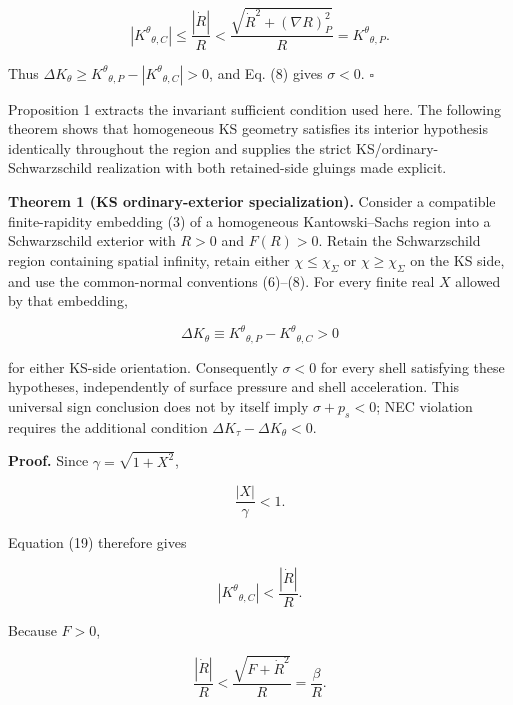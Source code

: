 \documentclass[pdflatex,sn-mathphys-num]{sn-jnl}
\begin{document}
\[
\left|K^\theta{}_{\theta,C}\right|
\le\frac{|\dot R|}{R}
<\frac{\sqrt{\dot R^2+(\nabla R)^2_P}}{R}
=K^\theta{}_{\theta,P}.
\]

Thus \(\Delta K_\theta\ge K^\theta{}_{\theta,P}-|K^\theta{}_{\theta,C}|>0\), and Eq. (8) gives \(\sigma<0\). \(\square\)


Proposition 1 extracts the invariant sufficient condition used here. The following theorem shows that homogeneous KS geometry satisfies its interior hypothesis identically throughout the region and supplies the strict KS/ordinary-Schwarzschild realization with both retained-side gluings made explicit.


\textbf{Theorem 1 (KS ordinary-exterior specialization).} Consider a compatible finite-rapidity embedding (3) of a homogeneous Kantowski--Sachs region into a Schwarzschild exterior with \(R>0\) and \(F(R)>0\). Retain the Schwarzschild region containing spatial infinity, retain either \(\chi\le\chi_\Sigma\) or \(\chi\ge\chi_\Sigma\) on the KS side, and use the common-normal conventions (6)--(8). For every finite real \(X\) allowed by that embedding,


\begin{equation}
\Delta K_\theta
\equiv K^\theta{}_{\theta,P}-K^\theta{}_{\theta,C}>0
\tag{21}
\end{equation}

for either KS-side orientation. Consequently \(\sigma<0\) for every shell satisfying these hypotheses, independently of surface pressure and shell acceleration. This universal sign conclusion does not by itself imply \(\sigma+p_s<0\); NEC violation requires the additional condition \(\Delta K_\tau-\Delta K_\theta<0\).


\textbf{Proof.} Since \(\gamma=\sqrt{1+X^2}\),


\begin{equation}
\frac{|X|}{\gamma}<1.
\tag{22}
\end{equation}

Equation (19) therefore gives


\begin{equation}
\left|K^\theta{}_{\theta,C}\right|
<\frac{|\dot R|}{R}.
\tag{23}
\end{equation}

Because \(F>0\),


\begin{equation}
\frac{|\dot R|}{R}
<\frac{\sqrt{F+\dot R^2}}{R}
=\frac{\beta}{R}.
\tag{24}
\end{equation}
\end{document}
